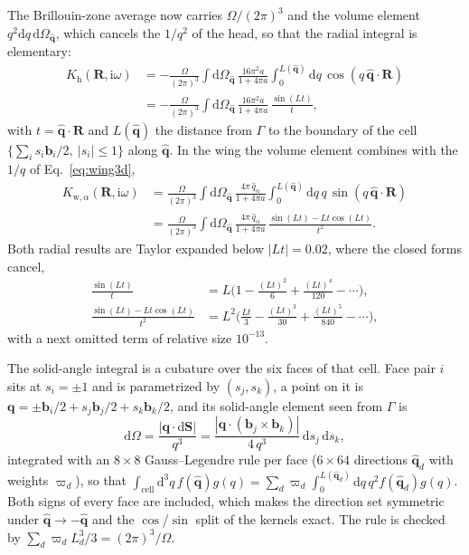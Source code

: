 \documentclass[%
 reprint,
superscriptaddress,
 amsmath,amssymb,
 aps,
prb,
]{revtex4-2}
\newcommand{\bR}{\mathbf{R}}
\newcommand{\bq}{\mathbf{q}}
\newcommand{\qhat}{\hat{\mathbf{q}}}
\newcommand{\dd}{\mathrm{d}}
\newcommand{\ii}{\mathrm{i}}
\newcommand{\head}{\mathrm{h}}
\newcommand{\wing}{\mathrm{w}}
\begin{document}
The Brillouin-zone average now carries $\Omega/(2\pi)^3$ and the volume element
$q^2\dd q\,\dd\Omega_{\qhat}$, which cancels the $1/q^2$ of the head, so that the radial
integral is elementary:
\begin{equation}
\begin{aligned}
  K_\head(\bR,\ii\omega) &= -\frac{\Omega}{(2\pi)^3}\int\dd\Omega_{\qhat}\,
  \frac{16\pi^2 a}{1+4\pi a}\int_0^{L(\qhat)}\dd q\,\cos(q\,\qhat\cdot\bR)\\
  &= -\frac{\Omega}{(2\pi)^3}\int\dd\Omega_{\qhat}\,\frac{16\pi^2 a}{1+4\pi a}\,
  \frac{\sin(Lt)}{t},
\end{aligned}
  \label{eq:Kh3d}
\end{equation}
with $t = \qhat\cdot\bR$ and $L(\qhat)$ the distance from $\Gamma$ to the boundary of the cell
$\{\sum_i s_i\mathbf b_i/2,\ |s_i|\le1\}$ along $\qhat$. In the wing the volume element combines
with the $1/q$ of Eq.~\eqref{eq:wing3d},
\begin{equation}
\begin{aligned}
  K_{\wing,\alpha}(\bR,\ii\omega) &= \frac{\Omega}{(2\pi)^3}\int\dd\Omega_{\qhat}\,
  \frac{4\pi\,\hat q_\alpha}{1+4\pi a}\int_0^{L(\qhat)}\dd q\,q\,\sin(q\,\qhat\cdot\bR)\\
  &= \frac{\Omega}{(2\pi)^3}\int\dd\Omega_{\qhat}\,\frac{4\pi\,\hat q_\alpha}{1+4\pi a}\,
  \frac{\sin(Lt) - Lt\cos(Lt)}{t^2}.
\end{aligned}
  \label{eq:Kw3d}
\end{equation}
Both radial results are Taylor expanded below $|Lt| = 0.02$, where the closed forms cancel,
\begin{equation}
\begin{aligned}
  \frac{\sin(Lt)}{t} &= L\Big(1 - \frac{(Lt)^2}{6} + \frac{(Lt)^4}{120} - \cdots\Big),\\
  \frac{\sin(Lt)-Lt\cos(Lt)}{t^2} &= L^2\Big(\frac{Lt}{3} - \frac{(Lt)^3}{30} + \frac{(Lt)^5}{840} - \cdots\Big),
\end{aligned}
  \label{eq:taylor}
\end{equation}
with a next omitted term of relative size $10^{-13}$.

The solid-angle integral is a cubature over the six faces of that cell. Face pair $i$ sits at
$s_i=\pm1$ and is parametrized by $(s_j,s_k)$, a point on it is
$\bq = \pm\mathbf b_i/2 + s_j\mathbf b_j/2 + s_k\mathbf b_k/2$, and its solid-angle element
seen from $\Gamma$ is
\begin{equation}
  \dd\Omega = \frac{|\bq\cdot\dd\mathbf S|}{q^3}
  = \frac{|\bq\cdot(\mathbf b_j\times\mathbf b_k)|}{4\,q^3}\,\dd s_j\,\dd s_k ,
  \label{eq:dOmega}
\end{equation}
integrated with an $8\times8$ Gauss--Legendre rule per face ($6\times64$ directions $\qhat_d$
with weights $\varpi_d$), so that
$\int_\mathrm{cell}\dd^3q\,f(\qhat)g(q) = \sum_d\varpi_d\int_0^{L(\qhat_d)}\dd q\,q^2f(\qhat_d)g(q)$.
Both signs of every face are included, which makes the direction set symmetric under
$\qhat\to-\qhat$ and the $\cos$/$\sin$ split of the kernels exact. The rule is checked by
$\sum_d \varpi_d L_d^3/3 = (2\pi)^3/\Omega$.
\end{document}
